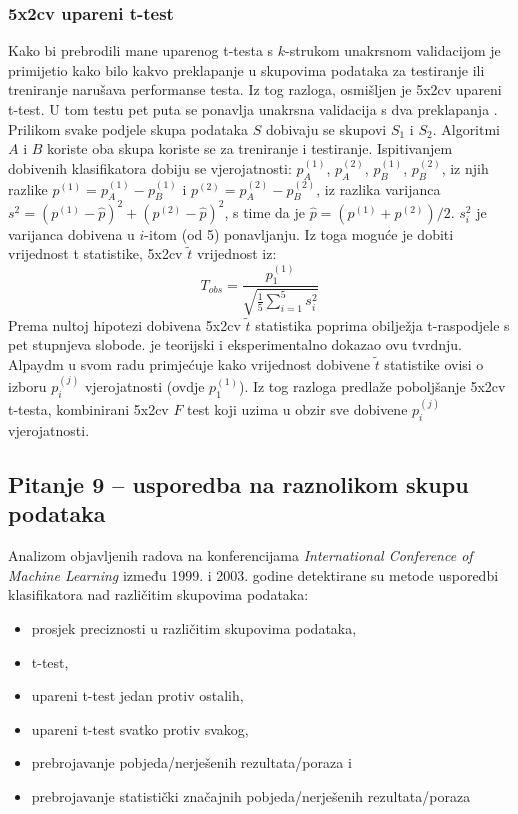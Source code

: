 \subsubsection{5x2cv upareni t-test}

Kako bi prebrodili mane uparenog t-testa s $k$-strukom unakrsnom validacijom \citep{dietterich1998approximate} je primijetio kako bilo kakvo preklapanje u skupovima podataka za testiranje ili treniranje narušava performanse testa. Iz tog razloga, osmišljen je 5x2cv upareni t-test. U tom testu pet puta se ponavlja unakrsna validacija s dva preklapanja . Prilikom svake podjele skupa podataka $S$ dobivaju se skupovi $S_1$ i $S_2$. Algoritmi $A$ i $B$ koriste oba skupa koriste se za treniranje i testiranje. Ispitivanjem dobivenih klasifikatora dobiju se vjerojatnosti: $p_{A}^{(1)}$, $p_{A}^{(2)}$, $p_{B}^{(1)}$, $p_{B}^{(2)}$, iz njih razlike $p^{(1)}=p_{A}^{(1)}-p_{B}^{(1)}$ i $p^{(2)}=p_{A}^{(2)}-p_{B}^{(2)}$, iz razlika varijanca $s^2=(p^{(1)}-\hat{p})^2+(p^{(2)} - \hat{p})^2$, s time da je $\hat{p} = (p^{(1)}+p^{(2)})/2$. $s_{i}^{2}$ je varijanca dobivena u $i$-itom (od 5) ponavljanju. Iz toga moguće je dobiti vrijednost t statistike, 5x2cv $\tilde{t}$ vrijednost iz:
\begin{equation}
T_{obs} = \frac{p_{1}^{(1)}}{\sqrt{\frac{1}{5}\sum_{i=1}^{5}s_{i}^{2}}}
\end{equation}
Prema nultoj hipotezi dobivena 5x2cv $\tilde{t}$ statistika poprima obilježja t-raspodjele s pet stupnjeva slobode. \citep{dietterich1998approximate} je teorijski i eksperimentalno dokazao ovu tvrdnju. Alpaydm u svom radu \citep{alpaydm1999combined}  primjećuje kako vrijednost dobivene $\tilde{t}$ statistike ovisi o izboru $p_{i}^{(j)}$ vjerojatnosti (ovdje $p_{1}^{(1)}$). Iz tog razloga predlaže poboljšanje 5x2cv t-testa, kombinirani 5x2cv $F$ test koji uzima u obzir sve dobivene $p_{i}^{(j)}$ vjerojatnosti. 

\subsection{Pitanje 9 -- usporedba na raznolikom skupu podataka}
\label{subsec:couting}

Analizom objavljenih radova na konferencijama \textit{International Conference of Machine Learning} između 1999. i 2003. godine \citep{demvsar2006statistical} detektirane su metode usporedbi klasifikatora nad različitim skupovima podataka:
\begin{itemize}
\item prosjek preciznosti u različitim skupovima podataka,
\item t-test,
\item upareni t-test jedan protiv ostalih,
\item upareni t-test svatko protiv svakog,
\item prebrojavanje pobjeda/nerješenih rezultata/poraza i
\item prebrojavanje statistički značajnih pobjeda/nerješenih rezultata/poraza
\end{itemize}


